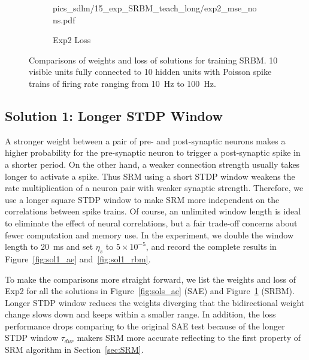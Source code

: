\begin{figure}
\begin{subfigure}[c]{0.45\textwidth}
{			{pics_sdlm/15_exp_SRBM_teach_long/exp2_mse_nons.pdf}}\\
		\caption{Exp2 Loss}
	\end{subfigure}%
	\caption{Comparisons of weights and loss of solutions for training SRBM. 10 visible units fully connected to 10 hidden units with Poisson spike trains of firing rate ranging from 10~Hz to 100~Hz.}
	\label{fig:sols_rbm}
\end{figure}

\subsection{Solution 1: Longer STDP Window}
A stronger weight between a pair of pre- and post-synaptic neurons makes a higher probability for the pre-synaptic neuron to trigger a post-synaptic spike in a shorter period.
On the other hand, a weaker connection strength usually takes longer to activate a spike.
Thus SRM using a short STDP window weakens the rate multiplication of a neuron pair with weaker synaptic strength.
Therefore, we use a longer square STDP window to make SRM more independent on the correlations between spike trains.
Of course, an unlimited window length is ideal to eliminate the effect of neural correlations, but a fair trade-off concerns about fewer computation and memory use.
In the experiment, we double the window length to 20~ms and set $\eta_s$ to $5 \times 10^{-5}$, and record the complete results in Figure~\ref{fig:sol1_ae} and~\ref{fig:sol1_rbm}.

To make the comparisons more straight forward, we list the weights and loss of Exp2 for all the solutions in Figure~\ref{fig:sols_ae} (SAE) and Figure~\ref{fig:sols_rbm} (SRBM).
Longer STDP window reduces the weights diverging that the bidirectional weight change slows down and keeps within a smaller range.
In addition, the loss performance drops comparing to the original SAE test because of the longer STDP window $\tau_{dur}$ makers SRM more accurate reflecting to the first property of SRM algorithm in Section~\ref{sec:SRM}.



